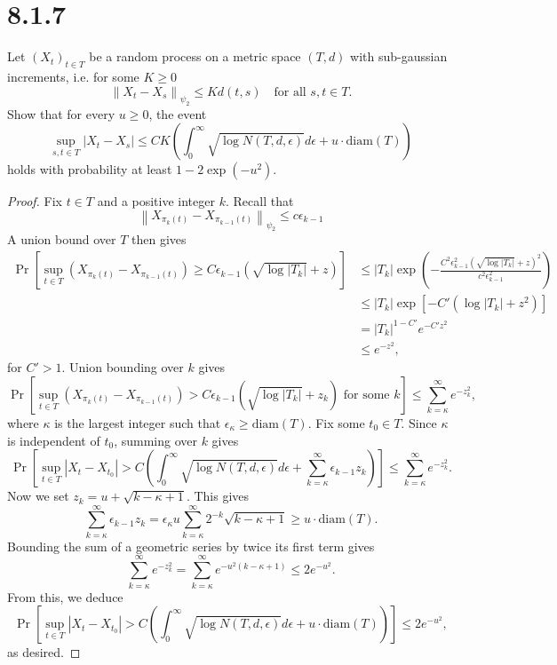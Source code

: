 \documentclass[11pt,letterpaper]{report}
\newcommand{\diam}{\text{diam}}
\newcommand{\subg}[1]{\left\|{#1}\right\|_{\psi_2}}
\begin{document}
\section*{8.1.7}
Let $(X_t)_{t\in T}$ be a random process on a metric space $(T, d)$ with sub-gaussian increments, i.e. for some $K\geq 0$
\[
\subg{X_t-X_s}\leq Kd(t,s)\quad\text{for all }s,t\in T.
\]
Show that for every $u\geq 0$, the event
\[
\sup_{s,t\in T}|X_t-X_s|\leq CK\left(\int_0^\infty\sqrt{\log N(T, d, \epsilon)}d\epsilon + u\cdot \diam(T)\right)
\]
holds with probability at least $1-2\exp(-u^2)$.
\begin{proof}
	Fix $t\in T$ and a positive integer $k$. Recall that
	\[
	\subg{X_{\pi_{k}(t)}-X_{\pi_{k-1}(t)}}\leq c\epsilon_{k-1}
	\]
	A union bound over $T$ then gives
	\begin{align*}
		\Pr\left[\sup_{t\in T} (X_{\pi_k(t)}-X_{\pi_{k-1}(t)})\geq C\epsilon_{k-1}(\sqrt{\log|T_k|}+z)\right] &\leq |T_k|\exp\left(-\frac{C^2\epsilon_{k-1}^2(\sqrt{\log |T_k|}+z)^2}{c^2\epsilon_{k-1}^2}\right)\\
		&\leq |T_k|\exp[-C'(\log|T_k|+z^2)]\\
		&= |T_k|^{1-C'}e^{-C'z^2}\\
		&\leq e^{-z^2},
	\end{align*}
	for $C'>1$. Union bounding over $k$ gives
	\[
	\Pr\left[\sup_{t\in T}(X_{\pi_k(t)}-X_{\pi_{k-1}(t)}) > C\epsilon_{k-1}(\sqrt{\log|T_k|} + z_k)\text{ for some }k\right] \leq \sum_{k=\kappa}^\infty e^{-z_k^2},
	\]
	where $\kappa$ is the largest integer such that $\epsilon_{\kappa} \geq \diam(T)$. Fix some $t_0\in T$. Since $\kappa$ is independent of $t_0$, summing over $k$ gives
	\[
	\Pr\left[\sup_{t\in T}|X_t-X_{t_0}| > C\left(\int_0^\infty \sqrt{\log N(T, d, \epsilon)}d\epsilon + \sum_{k=\kappa}^\infty\epsilon_{k-1}z_k\right) \right]\leq \sum_{k=\kappa}^\infty e^{-z_k^2}.
	\]
	Now we set $z_k = u+\sqrt{k-\kappa+1}$. This gives
	\[
	\sum_{k=\kappa}^\infty \epsilon_{k-1}z_k = \epsilon_\kappa u\sum_{k=\kappa}^\infty 2^{-k}\sqrt{k-\kappa+1}\geq u\cdot \diam(T).
	\]
	Bounding the sum of a geometric series by twice its first term gives
	\[
	\sum_{k=\kappa}^\infty e^{-z_k^2} = \sum_{k=\kappa}^\infty e^{-u^2(k-\kappa+1)} \leq 2e^{-u^2}.
	\]
	From this, we deduce
	\[
	\Pr\left[\sup_{t\in T}|X_t-X_{t_0}| > C\left(\int_0^\infty \sqrt{\log N(T, d, \epsilon)}d\epsilon + u\cdot \diam (T)\right) \right]\leq 2e^{-u^2},
	\]
	as desired.
\end{proof}
\end{document}
